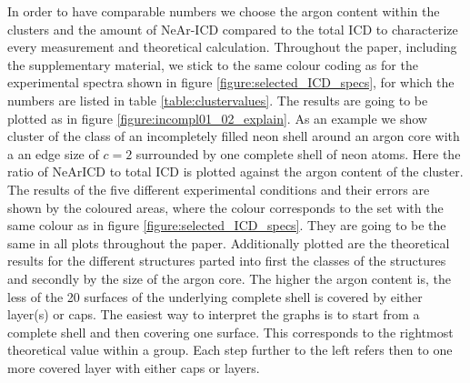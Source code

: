 In order to have comparable numbers we choose the argon content within
the clusters and the amount of NeAr-ICD compared to the total ICD to
characterize every measurement and theoretical calculation.
Throughout the paper, including the supplementary material, we stick to the same 
colour coding as for the experimental spectra shown in figure \ref{figure:selected_ICD_specs},
for which the numbers are listed in table \ref{table:clustervalues}.
The results are going to be plotted as in figure \ref{figure:incompl01_02_explain}.
As an example we show cluster of the class of an incompletely filled neon shell
around an argon core with a an edge size of $c=2$
surrounded by one complete shell of neon atoms.
Here the ratio of NeArICD to total ICD is plotted against the argon content
of the cluster. The results of the five different experimental conditions and their
errors are shown by the coloured areas, where the colour corresponds to the
set with the same colour as in figure \ref{figure:selected_ICD_specs}.
They are going to be the same in all plots throughout the paper.
Additionally plotted are the theoretical results for the different structures
parted into first the classes of the structures and secondly by the size of the argon core.
The higher the argon content is, the less of the 20 surfaces of the underlying
complete shell is covered by either layer(s) or caps. The easiest way to interpret
the graphs is to start from a complete shell and then covering one surface. This
corresponds to the rightmost theoretical value within a group. Each step further
to the left refers then to one more covered layer with either caps or layers.\\

